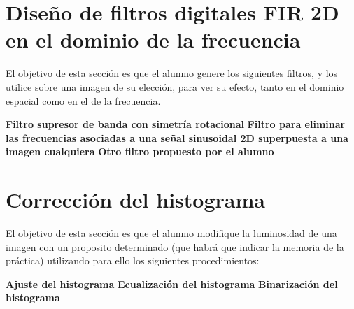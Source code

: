 \documentclass[10pt,twoside,spanish,a4paper]{article}
\begin{document}
\section*{Dise\~{n}o de filtros digitales FIR 2D en el dominio de la frecuencia}

El objetivo de esta secci\'{o}n es que el alumno genere los siguientes filtros, y los utilice sobre una imagen de su elecci\'{o}n, para ver su efecto, tanto en el
dominio espacial como en el de la frecuencia.


\begin{itemize}
\itemP \textbf{Filtro supresor de banda con simetr\'{i}a rotacional}
\itemP  \textbf{Filtro para eliminar las frecuencias asociadas a una se\~{n}al sinusoidal 2D superpuesta a una imagen cualquiera}
\itemP \textbf{Otro filtro propuesto por el alumno}
\end{itemize}

\section*{Correcci\'{o}n del histograma}


El objetivo de esta secci\'{o}n es que el alumno modifique la luminosidad de una imagen con un proposito determinado (que habr\'{a} que indicar la memoria de la pr\'{a}ctica) utilizando para ello los siguientes procedimientos:

\begin{itemize}
\itemP \textbf{Ajuste del histograma}
\itemP  \textbf{Ecualizaci\'{o}n del histograma}
\itemP \textbf{Binarizaci\'{o}n del histograma}
\end{itemize}
\end{document}
